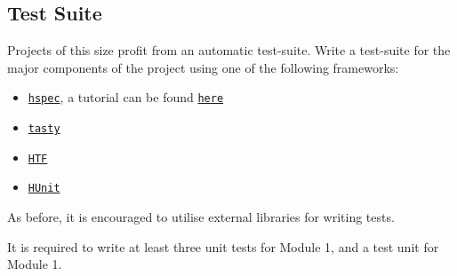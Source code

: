 \documentclass{article}
\begin{document}
\subsection{Test Suite}
Projects of this size profit from an automatic test-suite. 
Write a test-suite for the major components of the project using one of the following frameworks:

\begin{itemize}
\item \href{https://hackage.haskell.org/package/hspec}{\texttt{hspec}}, a tutorial can be found \href{https://hspec.github.io/}{\texttt{here}}
\item \href{https://hackage.haskell.org/package/tasty}{\texttt{tasty}}
\item \href{https://hackage.haskell.org/package/HTF}{\texttt{HTF}}
\item \href{https://hackage.haskell.org/package/HUnit}{\texttt{HUnit}}
\end{itemize}

As before, it is encouraged to utilise external libraries for writing tests.

It is required to write at least three unit tests for Module 1, and a test unit for Module 1.
\end{document}

